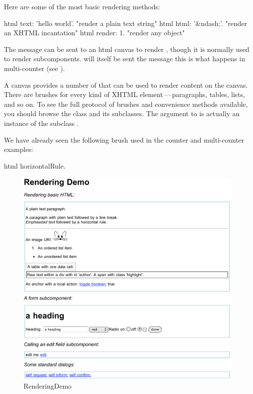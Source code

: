 \documentclass[a4paper,10pt,twoside]{book}
\begin{document}
Here are some of the most basic rendering methods:
\begin{code}{}
html text: 'hello world'.  "render a plain text string"
html html: '&ndash;'.     "render an XHTML incantation"
html render: 1.              "render any object"
\end{code}

The message  can be sent to an html canvas to render , though it is normally used to render subcomponents.   will itself be sent the message 
this is what happens in multi-counter (see ).

A canvas provides a number of  that can be used to render content on the canvas.
There are brushes for every kind of XHTML element\,---\,paragraphs, tables, lists, and so on.
To see the full protocol of brushes and convenience methods available, you should browse the class  and its subclasses.
The argument to  is actually an instance of the subclass .

We have already seen the following brush used in the counter and multi-counter examples:
\begin{code}{}
html horizontalRule.
\end{code}

\begin{figure}[ht]
\begin{center}
\includegraphics[width=\textwidth]{RenderingDemo}
\caption{RenderingDemo}
\label{fig:RenderingDemo}
\end{center}
\end{figure}
\end{document}
